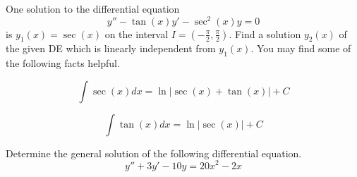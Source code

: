 \documentclass[exam=2]{math252exam}
\begin{document}
\maketitle

\begin{problems}
	\problem One solution to the differential equation \[ y'' - \tan(x)y' - \sec^{2}(x)y = 0 \] is $y_{1}(x)=\sec(x)$ on the interval $I = \left( -\frac{\pi}{2}, \frac{\pi}{2} \right)$. Find a solution $y_{2}(x)$ of the given DE which is linearly independent from $y_{1}(x)$. You may find some of the following facts helpful.
	\begin{minipage}{0.5\textwidth}
		\[ \int \sec(x)dx = \ln|\sec(x) + \tan(x)| + C \]
	\end{minipage}\begin{minipage}{0.5\textwidth}
		\[ \int \tan(x)dx = \ln|\sec(x)| + C \]
	\end{minipage}
	\problem Determine the general solution of the following differential equation. \[ y'' + 3y' - 10y = 20x^{2} - 2x \]
\end{problems}
\end{document}
